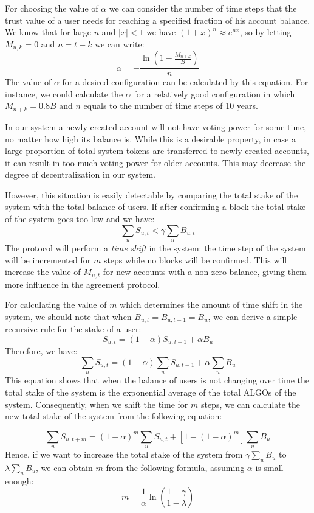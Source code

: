 \documentclass[11pt, A4]{report}
\begin{document}
    For choosing the value of \(\alpha\) we can consider the number of time steps that the trust value of a user needs
    for reaching a specified fraction of his account balance. We know that for large \(n\) and \(|x| < 1\) we have
    \((1 + x)^n \approx e^{nx}\), so by letting \(M_{u,k} = 0\) and \(n = t - k\) we can write:
    \[
        \alpha =- \frac{\ln\left(1 - \frac{M_{n+k}}{B}\right)}{n}
    \]
    The value of \(\alpha\) for a desired configuration can be calculated by this equation. For instance, we could
    calculate the \(\alpha\) for a relatively good configuration in which \(M_{n+k} = 0.8B\) and \(n\) equals to the
    number of time steps of 10 years.

    In our system a newly created account will not have voting power for some time, no matter how high its
    balance is. While this is a desirable property, in case a large proportion of total system tokens are
    transferred to newly created accounts, it can result in too much voting power for older accounts. This may decrease
    the degree of decentralization in our system.

    However, this situation is easily detectable by comparing the total stake of the system with the total balance of
    users. If after confirming a block the total stake of the system goes too low and we have:
    \[
        \sum_{u}S_{u,t} < \gamma \sum_{u}B_{u,t}
    \]
    The protocol will perform a \emph{time shift} in the system: the time step of the system
    will be incremented for \(m\) steps while no blocks will be confirmed. This will increase the value of \(M_{u,t}\)
    for new accounts with a non-zero balance, giving them more influence in the agreement protocol.

    For calculating the value of \(m\) which determines the amount of time shift in the system, we should note that when
    \(B_{u,t} = B_{u, t-1} = B_u\), we can derive a simple recursive rule for the stake of a user:
    \[
        S_{u,t} = (1 - \alpha) S_{u,t-1} + \alpha B_u
    \]
    Therefore, we have:
    \[
        \sum_{u}S_{u,t} = (1 - \alpha) \sum_{u}S_{u,t - 1} + \alpha \sum_{u}B_u
    \]
    This equation shows that when the balance of users is not changing over time the total stake of the system is the
    exponential average of the total ALGOs of the system. Consequently, when we shift the time for \(m\) steps, we can
    calculate the new total stake of the system from the following equation:

    \[
        \sum_{u}S_{u,t+m} = (1 - \alpha)^{m}\sum_{u}S_{u,t} + [1 - (1 - \alpha)^{m}]\sum_{u}B_u
    \]
    Hence, if we want to increase the total stake of the system from \(\gamma \sum_{u}B_u\) to \(\lambda \sum_{u}B_u\),
    we can obtain \(m\) from the following formula, assuming \(\alpha\) is small enough:
    \[
        m = \frac{1}{\alpha} \ln \left(\frac{1 - \gamma}{1 - \lambda}\right)
    \]
\end{document}
